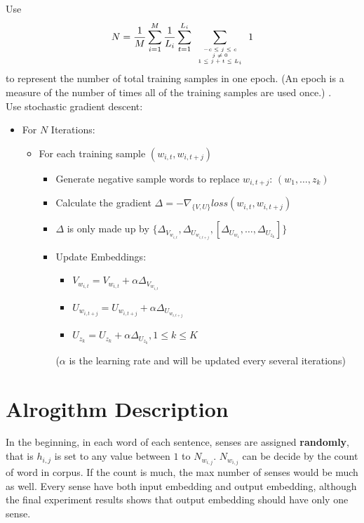 	
Use 
	$$N = \frac{1}{M}\sum_{i=1}^M\frac{1}{L_i}\sum_{t=1}^{L_i}\sum\limits_{\mbox{\tiny$\begin{array}{c}-c\leq j \leq c\\ j\neq 0\\ 1\leq j+t\leq L_i\end{array}$}} 1$$
	to represent the number of total training samples in one epoch. (An epoch is a measure of the number of times all of the training samples are used once.) .\\
	
	Use stochastic gradient descent: 
	\begin{itemize}
	\item For $N$ Iterations: 
		\begin{itemize}
		\item For each training sample $(w_{i,t},w_{i,{t+j}})$
		\begin{itemize}
		\item Generate negative sample words to replace $w_{i,t+j}$: $(w_1,\ldots,z_k)$
		\item Calculate the gradient $\Delta = -\nabla_{\{V,U\}} loss(w_{i,t},w_{i,{t+j}})$
		\item $\Delta$ is only made up by $\{\Delta_{V_{w_{i,t}}}, \Delta_{U_{w_{i,t+j}}}, [\Delta_{U_{w_1}},\ldots,\Delta_{U_{z_k}}]\}$
		\item Update Embeddings: 
		\begin{itemize}
		\item $V_{w_{i,t}} = V_{w_{i,t}}+\alpha\Delta_{V_{w_{i,t}}}$
		\item $U_{w_{i,t+j}} = U_{w_{i,t+j}}+\alpha\Delta_{U_{w_{i,t+j}}}$
		\item $U_{z_k} = U_{z_k}+\alpha\Delta_{U_{z_k}}, 1\leq k\leq K$ 
		\end{itemize}
		($\alpha$ is the learning rate and will be updated every several iterations)
		\end{itemize}
		\end{itemize}
	\end{itemize}


\section{Alrogithm Description}

In the beginning, in each word of each sentence, senses are assigned \textbf{randomly}, that is $h_{i,j}$ is set to any value between $1$ to $N_{w_{i,j}}$. $N_{w_{i,j}}$ can be decide by the count of word in corpus. If the count is much, the max number of senses would be much as well. Every sense have both input embedding and output embedding, although the final experiment results shows that output embedding should have only one sense.\\

